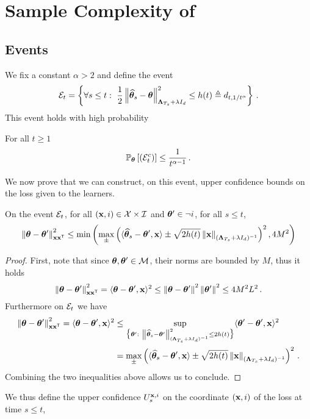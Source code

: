 \section{Sample Complexity of \texorpdfstring{\LG{}}{}}\label{app:lgc.proof}

\subsection{Events}\label{app:lgc.proof_nc.events}
We fix a constant $\alpha>2$ and define the event
\[
\cE_t = \left\{\forall s \leq  t:\ \frac{1}{2}\normm{\hbtheta_s-\btheta}^2_{\bLambda_{T_s}+\lambda I_d} \leq h(t)\eqdef d_{t,1/t^\alpha}\right\}\,.
\]
This event holds with high probability
\begin{lemma}
\label{lem:prb_Et_nc}
For all $t \geq 1$
\[
    \mathbb{P}_{\boldsymbol \theta}\left[\left(\mathcal{E}_t^c\right)\right]\leq \frac{1}{t^{\alpha-1}}\,.
\]
\end{lemma}
We now prove that we can construct, on this event, upper confidence bounds on the loss given to the learners.
\begin{lemma}
\label{lem:confidence_bound_general_nc}
On the event $\mathcal{E}_t$, for all $({\bf x},i)\in\mathcal{X}\times\mathcal{I}$ and ${\boldsymbol \theta}'\in\neg i$, for all $s\leq t$,
\[
\left\lVert{\boldsymbol \theta}-{\boldsymbol \theta}'\right\rVert^2_{{\bf x}{\bf x}^\mathsf{\scriptscriptstyle T}} \leq \min\left(\max_\pm \left( \langle \widehat{{\boldsymbol \theta}}_{s} - {\boldsymbol \theta}',{\bf x}\rangle \pm \sqrt{2 h(t)} \left\lVert{\bf x}\right\rVert_{({\boldsymbol \Lambda}_{T_s}+ \lambda I_d)^{-1}} \right)^2,4M^2\right)
\]
\end{lemma}
\begin{proof}
First, note that since ${\boldsymbol \theta},{\boldsymbol \theta}'\in\mathcal{M}$, their norms are bounded by $M$, thus it holds
\[
\left\lVert{\boldsymbol \theta}-{\boldsymbol \theta}'\right\rVert^2_{{\bf x}{\bf x}^\mathsf{\scriptscriptstyle T}} = \langle{\boldsymbol \theta}-{\boldsymbol \theta}',{\bf x} \rangle^2 \leq \left\lVert{\boldsymbol \theta}-{\boldsymbol \theta}'\right\rVert^2 \left\lVert{\boldsymbol \theta}'\right\rVert^2 \leq 4M^2L^2\,.
\]
Furthermore on $\mathcal{E}_t$ we have
\begin{align*}
\normm{\btheta-\btheta'}^2_{\bx\bx\transpose} = \langle\btheta-\btheta',\bx \rangle^2 &\leq \sup_{\big\{\btheta':\ \normm{\hbtheta_s-\btheta'}^2_{(\bLambda_{T_s} + \lambda I_d)^{-1} } \leq 2h(t)\big\}} \langle\btheta'-\btheta',\bx \rangle^2\\
&=\max_\pm \left( \langle \hbtheta_{s} - \btheta',\bx\rangle \pm \sqrt{2 h(t)} \normm{\bx}_{(\bLambda_{T_s}+ \lambda I_d)^{-1}} \right)^2\,.
\end{align*}
Combining the two inequalities above allows us to conclude.
\end{proof}
We thus define the upper confidence $U_s^{{\bf x},i}$ on the coordinate $({\bf x},i)$ of the loss at time $s\leq t$,
